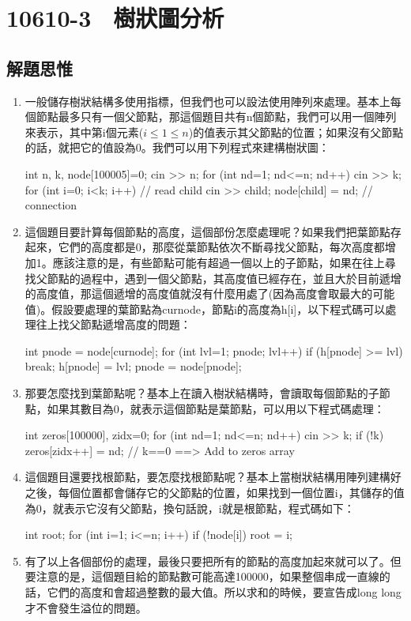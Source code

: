 \section{10610-3　樹狀圖分析}

\subsection{解題思惟}
\begin{enumerate}
	\item 一般儲存樹狀結構多使用指標，但我們也可以設法使用陣列來處理。基本上每個節點最多只有一個父節點，那這個題目共有n個節點，我們可以用一個陣列來表示，其中第i個元素($i\le 1\le n$)的值表示其父節點的位置；如果沒有父節點的話，就把它的值設為0。我們可以用下列程式來建構樹狀圖：
	\begin{inside}
		int n, k, node[100005]={0};
		cin >> n;
		for (int nd=1; nd<=n; nd++) {
			cin >> k;
			for (int i=0; i<k; i++) { // read child
				cin >> child;
				node[child] = nd; // connection
			}
		}
	\end{inside}
	\item 這個題目要計算每個節點的高度，這個部份怎麼處理呢？如果我們把葉節點存起來，它們的高度都是0，那麼從葉節點依次不斷尋找父節點，每次高度都增加1。應該注意的是，有些節點可能有超過一個以上的子節點，如果在往上尋找父節點的過程中，遇到一個父節點，其高度值已經存在，並且大於目前遞增的高度值，那這個遞增的高度值就沒有什麼用處了(因為高度會取最大的可能值)。假設要處理的葉節點為curnode，節點i的高度為h[i]，以下程式碼可以處理往上找父節點遞增高度的問題：
	\begin{inside}
	int pnode = node[curnode];
	for (int lvl=1; pnode; lvl++) {
		if (h[pnode] >= lvl) break;
		h[pnode] = lvl;
		pnode = node[pnode];
	}
	\end{inside}
	\item 那要怎麼找到葉節點呢？基本上在讀入樹狀結構時，會讀取每個節點的子節點，如果其數目為0，就表示這個節點是葉節點，可以用以下程式碼處理：
	\begin{inside}
	int zeros[100000], zidx=0;
	for (int nd=1; nd<=n; nd++) {
		cin >> k;
		if (!k) zeros[zidx++] = nd; // k==0 ==> Add to zeros array
	}
	\end{inside}
	\item 這個題目還要找根節點，要怎麼找根節點呢？基本上當樹狀結構用陣列建構好之後，每個位置都會儲存它的父節點的位置，如果找到一個位置i，其儲存的值為0，就表示它沒有父節點，換句話說，i就是根節點，程式碼如下：
	\begin{inside}
	int root;
	for (int i=1; i<=n; i++) {
		if (!node[i]) root = i;
	}
	\end{inside}
	\item 有了以上各個部份的處理，最後只要把所有的節點的高度加起來就可以了。但要注意的是，這個題目給的節點數可能高達100000，如果整個串成一直線的話，它們的高度和會超過整數的最大值。所以求和的時候，要宣告成long long才不會發生溢位的問題。
\end{enumerate}

